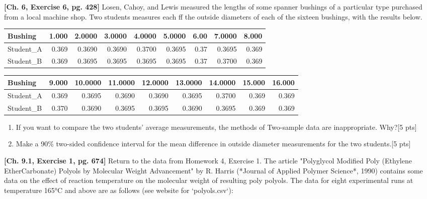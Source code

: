 \documentclass[11pt]{article}\usepackage[]{graphicx}\usepackage[]{color}
\begin{document}
{

\item \textbf{[Ch. 6, Exercise 6, pg. 428]} Losen, Cahoy, and Lewis measured the lengths of some spanner bushings of a particular type purchased from a local machine shop. Two students measures each ff the outside diameters of each of the sixteen bushings, with the results below.



\begin{tabular}{l|r|r|r|r|r|r|r|r}
\centering
\hline
Bushing & 1.000 & 2.0000 & 3.0000 & 4.0000 & 5.0000 & 6.00 & 7.0000 & 8.000\\
\hline
Student\_A & 0.369 & 0.3690 & 0.3690 & 0.3700 & 0.3695 & 0.37 & 0.3695 & 0.369\\
\hline
Student\_B & 0.369 & 0.3695 & 0.3695 & 0.3695 & 0.3695 & 0.37 & 0.3700 & 0.369\\
\hline
\end{tabular}

\begin{tabular}{l|r|r|r|r|r|r|r|r}
\centering
\hline
Bushing & 9.000 & 10.0000 & 11.0000 & 12.0000 & 13.0000 & 14.0000 & 15.000 & 16.000\\
\hline
Student\_A & 0.369 & 0.3695 & 0.3690 & 0.3690 & 0.3695 & 0.3700 & 0.369 & 0.369\\
\hline
Student\_B & 0.370 & 0.3690 & 0.3695 & 0.3695 & 0.3690 & 0.3695 & 0.369 & 0.369\\
\hline
\end{tabular}

\begin{enumerate}
\item If you want to compare the two students' average measurements, the methods of Two-sample data are inappropriate. Why?[5 pts]
    
\item Make a 90\% two-sided confidence interval for the mean difference in outside diameter measurements for the two students.[5 pts]
    
\end{enumerate}

\item \textbf{[Ch. 9.1, Exercise 1, pg. 674] }Return to the data from Homework 4, Exercise 1. The article "Polyglycol Modified Poly (Ethylene EtherCarbonate) Polyols by Molecular Weight Advancement" by R. Harris (*Journal of Applied Polymer Science*, 1990) contains some data on the effect of reaction temperature on the molecular weight of resulting poly polyols. The data for eight experimental runs at temperature 165°C and above are as follows (see website for `polyols.csv`):

}
\end{document}
